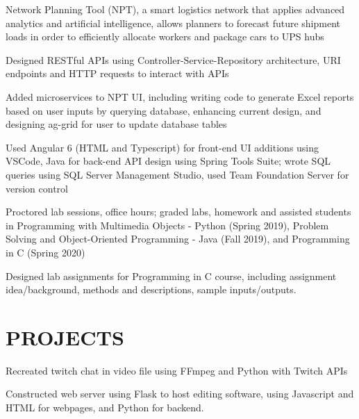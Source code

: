 \documentclass[]{deedy-resume-openfont}
\begin{document}
\begin{minipage}[t]{0.67\textwidth}
\begin{tightemize}
\item Network Planning Tool (NPT), a smart logistics network that applies advanced analytics and artificial intelligence, allows planners to forecast future shipment loads in order to efficiently allocate workers and package cars to UPS hubs
\item Designed RESTful APIs using Controller-Service-Repository architecture, URI endpoints and HTTP requests to interact with APIs
\item Added microservices to NPT UI, including writing code to generate Excel reports based on user inputs by querying database, enhancing current design, and designing ag-grid for user to update database tables
\item Used Angular 6 (HTML and Typescript) for front-end UI additions using VSCode, Java for back-end API design using Spring Tools Suite; wrote SQL queries using SQL Server Management Studio, used Team Foundation Server for version control
\end{tightemize}
\sectionsep

\begin{tightemize}
\item Proctored lab sessions, office hours; graded labs, homework and assisted students in Programming with Multimedia Objects - Python (Spring 2019), Problem Solving and Object-Oriented Programming - Java (Fall 2019), and Programming in C (Spring 2020)
\item Designed lab assignments for Programming in C course, including assignment idea/background, methods and descriptions, sample inputs/outputs.
\end{tightemize}
\sectionsep


\section {PROJECTS}

\begin{tightemize}
\item Recreated twitch chat in video file using FFmpeg and Python with Twitch APIs
\item Constructed web server using Flask to host editing software, using Javascript and HTML for webpages, and Python for backend.
\end{tightemize}
\sectionsep


\end{minipage}
\end{document}
